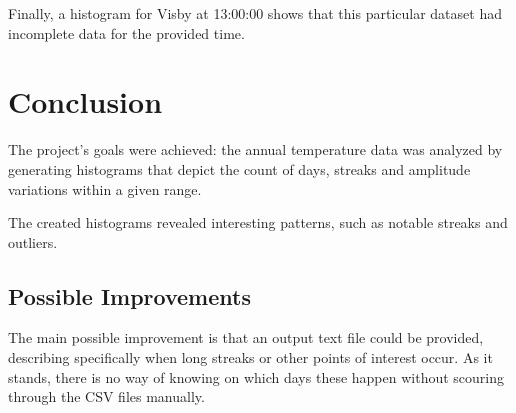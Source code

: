 \documentclass[12pt]{article}
\begin{document}
Finally, a histogram for Visby at 13:00:00 shows that this particular dataset had incomplete data for the provided time.

\begin{figure}[H]
    \centering
    \scalebox{.5}{}
    \label{fig:enter-label}
\end{figure}

\section{Conclusion}

The project's goals were achieved: the annual temperature data was analyzed by generating histograms that depict the count of days, streaks and amplitude variations within a given range.

The created histograms revealed interesting patterns, such as notable streaks and outliers.

\subsection{Possible Improvements}

The main possible improvement is that an output text file could be provided, describing specifically when long streaks or other points of interest occur. As it stands, there is no way of knowing on which days these happen without scouring through the CSV files manually.
\end{document}
